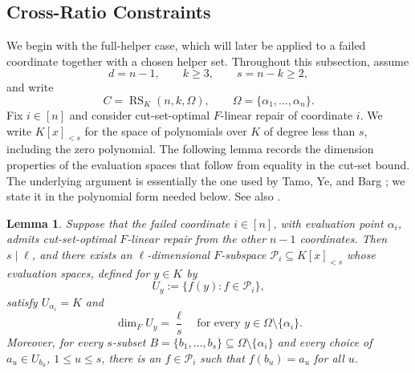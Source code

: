 \documentclass[11pt,onecolumn]{IEEEtran}
\newtheorem{lemma}{Lemma}
\newcommand{\RS}{\operatorname{RS}}
\begin{document}
\subsection{Cross-Ratio Constraints}

We begin with the full-helper case, which will later be applied to a
failed coordinate together with a chosen helper set.  Throughout this
subsection, assume
\[
d=n-1,\qquad k\ge3,\qquad s=n-k\ge2,
\]
and write
\[
C=\RS_K(n,k,\Omega),
\qquad
\Omega=\{\alpha_1,\ldots,\alpha_n\}.
\]
Fix $i\in[n]$ and consider cut-set-optimal
$F$-linear repair of coordinate $i$.
We write $K[x]_{<s}$ for the space of
polynomials over $K$ of degree less than $s$, including the zero polynomial.
The following lemma records the dimension properties of the evaluation
spaces that follow from equality in the cut-set bound.  The underlying
argument is essentially the one used by Tamo, Ye, and Barg
\cite[proof of Theorem~5]{TYB2017}; we state it in the polynomial form
needed below.  See also \cite{TYB2019}.

\begin{lemma}\label{lem:evaluation-rigidity}
Suppose that the failed coordinate $i\in[n]$, with evaluation point
$\alpha_i$, admits cut-set-optimal $F$-linear repair from the other
$n-1$ coordinates. Then $s\mid\ell$, and there exists an
$\ell$-dimensional $F$-subspace $\mathcal P_i\subseteq K[x]_{<s}$
whose evaluation spaces, defined for
$y\in K$ by
\[
U_y:=\{f(y):f\in\mathcal P_i\},
\]
satisfy $U_{\alpha_i}=K$ and
\[
\dim_F U_y=\frac{\ell}{s}
\quad\text{for every }y\in\Omega\setminus\{\alpha_i\}.
\]
Moreover, for every $s$-subset
$B=\{b_1,\ldots,b_s\}\subseteq\Omega\setminus\{\alpha_i\}$
and every choice of $a_u\in U_{b_u}$,
$1\le u\le s$, there is an $f\in\mathcal P_i$
such that $f(b_u)=a_u$
for all $u$.
\end{lemma}
\end{document}
